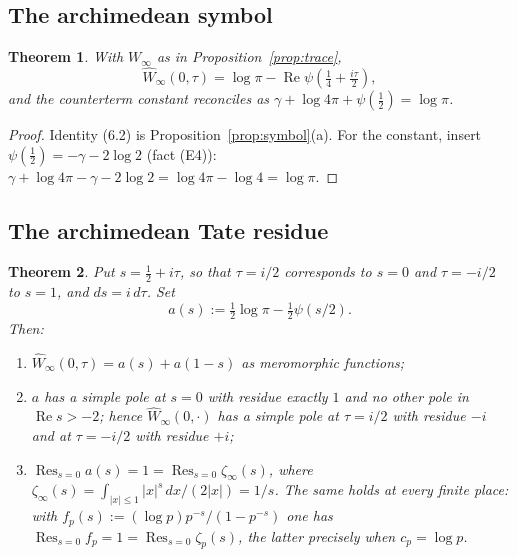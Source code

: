 \documentclass[11pt]{amsart}
\newtheorem{theorem}{Theorem}[section]
\theoremstyle{definition}
\theoremstyle{remark}
\newcommand{\Rel}{\operatorname{Re}}
\newcommand{\Res}{\operatorname*{Res}}
\begin{document}
\subsection{The archimedean symbol}

\begin{theorem}
\label{thm:archsymbol}
With $W_\infty$ as in Proposition~\emph{\ref{prop:trace}},
\begin{equation}
  \widehat W_\infty(0,\tau)=\log\pi-\Rel\psi(\tfrac14+\tfrac{i\tau}2),
\tag{6.2}
\end{equation}
and the counterterm constant reconciles as
$\gamma+\log4\pi+\psi(\tfrac12)=\log\pi$.
\end{theorem}

\begin{proof}
Identity (6.2) is Proposition~\ref{prop:symbol}(a).  For the constant, insert
$\psi(\tfrac12)=-\gamma-2\log2$ (fact (E4)):
$\gamma+\log4\pi-\gamma-2\log2=\log4\pi-\log4=\log\pi$.
\end{proof}

\subsection{The archimedean Tate residue}

\begin{theorem}
\label{thm:archresidue}
Put $s=\tfrac12+i\tau$, so that $\tau=i/2$ corresponds to $s=0$ and
$\tau=-i/2$ to $s=1$, and $ds=i\,d\tau$.  Set
\[
  a(s):=\tfrac12\log\pi-\tfrac12\psi(s/2).
\]
Then:
\begin{enumerate}
\item[(i)] $\widehat W_\infty(0,\tau)=a(s)+a(1-s)$ as meromorphic functions;
\item[(ii)] $a$ has a simple pole at $s=0$ with residue exactly $1$ and no
other pole in $\Rel s>-2$; hence $\widehat W_\infty(0,\cdot)$ has a simple pole
at $\tau=i/2$ with residue $-i$ and at $\tau=-i/2$ with residue $+i$;
\item[(iii)] $\Res_{s=0}a(s)=1=\Res_{s=0}\zeta_\infty(s)$, where
$\zeta_\infty(s)=\int_{|x|\le1}|x|^s\,dx/(2|x|)=1/s$.  The same holds at every
finite place: with $f_p(s):=(\log p)p^{-s}/(1-p^{-s})$ one has
$\Res_{s=0}f_p=1=\Res_{s=0}\zeta_p(s)$, the latter precisely when
$c_p=\log p$.
\end{enumerate}
\end{theorem}
\end{document}
